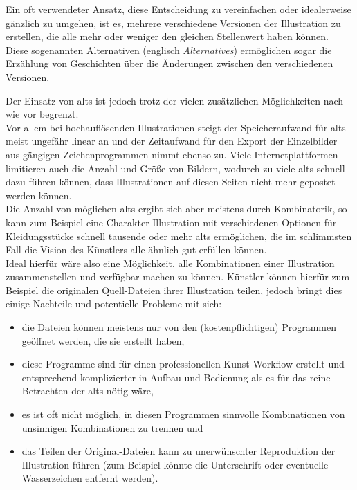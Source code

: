 \documentclass[oneside]{ausarbeitung}
\begin{document}
Ein oft verwendeter Ansatz, diese Entscheidung zu vereinfachen oder idealerweise gänzlich zu umgehen, ist es, mehrere verschiedene Versionen der Illustration zu erstellen, die alle mehr oder weniger den gleichen Stellenwert haben können. Diese sogenannten Alternativen (englisch \textit{Alternatives}) ermöglichen sogar die Erzählung von Geschichten über die Änderungen zwischen den verschiedenen Versionen.

Der Einsatz von \ac{alts} ist jedoch trotz der vielen zusätzlichen Möglichkeiten nach wie vor begrenzt.
\\Vor allem bei hochauflösenden Illustrationen steigt der Speicheraufwand für \ac{alts} meist ungefähr linear an und der Zeitaufwand für den Export der Einzelbilder aus gängigen Zeichenprogrammen nimmt ebenso zu. Viele Internetplattformen limitieren auch die Anzahl und Größe von Bildern, wodurch zu viele \ac{alts} schnell dazu führen können, dass Illustrationen auf diesen Seiten nicht mehr gepostet werden können.\\
Die Anzahl von möglichen \ac{alts} ergibt sich aber meistens durch Kombinatorik, so kann zum Beispiel eine Charakter-Illustration mit verschiedenen Optionen für Kleidungsstücke schnell tausende oder mehr \ac{alts} ermöglichen, die im schlimmsten Fall die Vision des Künstlers alle ähnlich gut erfüllen können.\\



Ideal hierfür wäre also eine Möglichkeit, alle Kombinationen einer Illustration zusammenstellen und verfügbar machen zu können. Künstler können hierfür zum Beispiel die originalen Quell-Dateien ihrer Illustration teilen, jedoch bringt dies einige Nachteile und potentielle Probleme mit sich:
\begin{itemize}
    \item die Dateien können meistens nur von den (kostenpflichtigen) Programmen geöffnet werden, die sie erstellt haben,
    \item diese Programme sind für einen professionellen Kunst-Workflow erstellt und entsprechend komplizierter in Aufbau und Bedienung als es für das reine Betrachten der \ac{alts} nötig wäre,
    \item es ist oft nicht möglich, in diesen Programmen sinnvolle Kombinationen von unsinnigen Kombinationen zu trennen und
    \item das Teilen der Original-Dateien kann zu unerwünschter Reproduktion der Illustration führen (zum Beispiel könnte die Unterschrift oder eventuelle Wasserzeichen entfernt werden).
\end{itemize}
\end{document}
